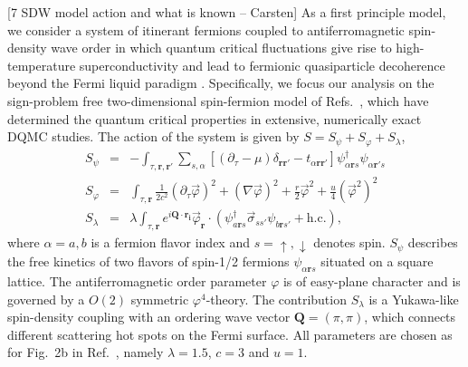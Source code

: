 \documentclass[amsmath,amssymb, aps, prx, longbibliography, twocolumn]{revtex4-1}
\begin{document}
[7 SDW model action and what is known -- Carsten]
As a first principle model, we consider a system of itinerant fermions coupled to antiferromagnetic spin-density wave order in which quantum critical fluctuations give rise to high-temperature superconductivity and lead to fermionic quasiparticle decoherence beyond the Fermi liquid paradigm \cite{Bauer2020, Schattner2016, Gerlach2017, Liu2018}.
Specifically, we focus our analysis on the sign-problem free \cite{Berg2012, Wu2005} two-dimensional spin-fermion model of Refs.~\cite{Schattner2016, Gerlach2017, Zhang2019}, which have determined the quantum critical properties in extensive, numerically exact DQMC studies. The action of the system is given by $S = S_\psi + S_\varphi + S_\lambda$,
\begin{eqnarray}
S_\psi &=&  - \int_{\tau, \mathbf{r}, \mathbf{r'}} \sum_{s, \alpha} \left[ \left(\partial_\tau - \mu\right)\delta_{\mathbf{r}\mathbf{r'}} - t_{\alpha \mathbf{r}\mathbf{r'}} \right] \psi_{\alpha \mathbf{r}s}^\dagger \psi_{\alpha \mathbf{r'}s} \nonumber\\
S_\varphi &=& \int_{\tau,\mathbf{r}} \frac{1}{2c^2} \left(\partial_\tau \vec{\varphi}\right)^2 + \left(\nabla \vec{\varphi} \right)^2 + \frac{r}{2}\vec \varphi^2 + \frac{u}{4} (\vec \varphi^2)^2 \label{eq:afmetal}\\
S_\lambda &=& \lambda \int_{\tau, \mathbf{r}} e^{i \mathbf{Q}\cdot \mathbf{r_i}} \vec{\varphi}_\mathbf{r} \cdot \left( \psi_{a\mathbf{r}s}^\dagger \vec{\sigma}_{ss'}  \psi_{b\mathbf{r}s'} + \textrm{h.c.} \right), \nonumber
\end{eqnarray}
where $\alpha=a,b$ is a fermion flavor index and $s=\uparrow, \downarrow$ denotes spin. $S_\psi$ describes the free kinetics of two flavors of spin-1/2 fermions $\psi_{\alpha \mathbf{r} s}$ situated on a square lattice. The antiferromagnetic order parameter $\varphi$ is of easy-plane character and is governed by a $O(2)$ symmetric $\varphi^4$-theory. The contribution $S_\lambda$ is a Yukawa-like spin-density coupling with an ordering wave vector $\mathbf{Q} = (\pi,\pi)$, which connects different scattering hot spots on the Fermi surface. All parameters are chosen as for Fig.~2b in Ref.~\cite{Gerlach2017}, namely $\lambda=1.5$, $c=3$ and $u=1$.
\end{document}
